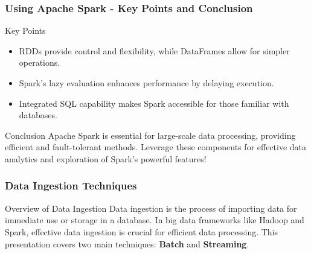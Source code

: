 \documentclass[aspectratio=169]{beamer}
\begin{document}
\begin{frame}[fragile]
    \frametitle{Using Apache Spark - Key Points and Conclusion}
    \begin{block}{Key Points}
        \begin{itemize}
            \item RDDs provide control and flexibility, while DataFrames allow for simpler operations.
            \item Spark's lazy evaluation enhances performance by delaying execution.
            \item Integrated SQL capability makes Spark accessible for those familiar with databases.
        \end{itemize}
    \end{block}
    
    \begin{block}{Conclusion}
        Apache Spark is essential for large-scale data processing, providing efficient and fault-tolerant methods. 
        Leverage these components for effective data analytics and exploration of Spark's powerful features!
    \end{block}
\end{frame}

\begin{frame}
    \frametitle{Data Ingestion Techniques}
    \begin{block}{Overview of Data Ingestion}
        Data ingestion is the process of importing data for immediate use or storage in a database. In big data frameworks like Hadoop and Spark, effective data ingestion is crucial for efficient data processing. This presentation covers two main techniques: \textbf{Batch} and \textbf{Streaming}.
    \end{block}
\end{frame}
\end{document}
